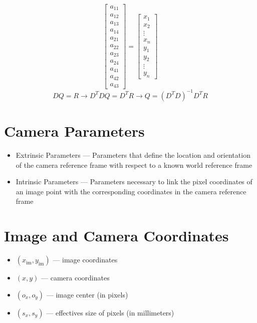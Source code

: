 \documentclass{article}
\begin{document}
\begin{enumerate}
\[\begin{bmatrix}
        a_{11} \\ a_{12} \\ a_{13} \\ a_{14} \\ a_{21} \\ a_{22} \\ a_{23} \\ a_{24} \\ a_{41} \\
        a_{42} \\ a_{43}
    \end{bmatrix} = \begin{bmatrix}
        x_1 \\ x_2 \\ \vdots \\ x_n \\ y_1 \\ y_2 \\ \vdots \\ y_n
    \end{bmatrix}\]
    \[DQ = R \longrightarrow D^T D Q = D^T R \longrightarrow Q = {(D^T D)}^{-1} D^T R\]
\end{enumerate}

\section*{Camera Parameters}
\begin{itemize}
    \item Extrinsic Parameters --- Parameters that define the location and orientation of the
    camera reference frame with respect to a known world reference frame
    \item Intrinsic Parameters --- Parameters necessary to link the pixel coordinates of an image
    point with the corresponding coordinates in the camera reference frame
\end{itemize}

\section*{Image and Camera Coordinates}
\begin{itemize}
    \item $(x_\text{im}, y_\text{im})$ --- image coordinates
    \item $(x, y)$ --- camera coordinates
    \item $(o_x, o_y)$ --- image center (in pixels)
    \item $(s_x, s_y)$ --- effectives size of pixels (in millimeters)
\end{itemize}
\end{document}
